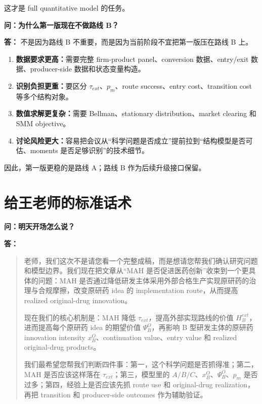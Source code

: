 \documentclass[10pt]{ctexart}
\newcommand{\qtitle}[1]{\vspace{0.35em}\noindent\textbf{问：#1}\par\vspace{0.15em}\noindent\textbf{答：}}
\newcommand{\key}[1]{\textbf{#1}}
\begin{document}
这才是 full quantitative model 的任务。

\qtitle{为什么第一版现在不做路线 B？}
不是因为路线 B 不重要，而是因为当前阶段不宜把第一版压在路线 B 上。

\begin{enumerate}
    \item \key{数据要求更高：}需要完整 firm-product panel、conversion 数据、entry/exit 数据、producer-side 数据和状态变量构造。
    \item \key{识别负担更重：}要区分 \(\tau_{ext}\)、\(p_m\)、route success、entry cost、transition cost 等多个结构对象。
    \item \key{数值求解更复杂：}需要 Bellman、stationary distribution、market clearing 和 SMM objective。
    \item \key{讨论风险更大：}容易把会议从“科学问题是否成立”提前拉到“结构模型是否可估、moments 是否足够识别”的技术细节。
\end{enumerate}

因此，第一版更稳的是路线 A；路线 B 作为后续升级接口保留。

\section{给王老师的标准话术}

\qtitle{明天开场怎么说？}
\begin{quote}
老师，我们这次不是请您看一个完整成稿，而是想请您帮我们确认研究问题和模型边界。我们现在把文章从“MAH 是否促进医药创新”收束到一个更具体的问题：MAH 是否通过降低研发主体采用外部合格生产实现原研药的治理与合规摩擦，改变原研药 idea 的 implementation route，从而提高 realized original-drug innovation。

现在我们的核心机制是：MAH 降低 \(\tau_{ext}\)，提高外部实现路线的价值 \(H_B^{ext}\)，进而提高每个原研药 idea 的期望价值 \(\Psi_B^O\)，再影响 B 型研发主体的原研药 innovation intensity \(x_B^O\)、continuation value、entry value 和 realized original-drug products。

我们最希望您帮我们判断四件事：第一，这个科学问题是否抓得准；第二，MAH 是否应该这样落在 \(\tau_{ext}\)；第三，模型里的 \(A/B/C\)、\(x_B^O\)、\(\Psi_B^O\)、\(p_m\) 是否过多；第四，经验上是否应该先抓 route use 和 original-drug realization，再把 transition 和 producer-side outcomes 作为辅助验证。
\end{quote}
\end{document}
